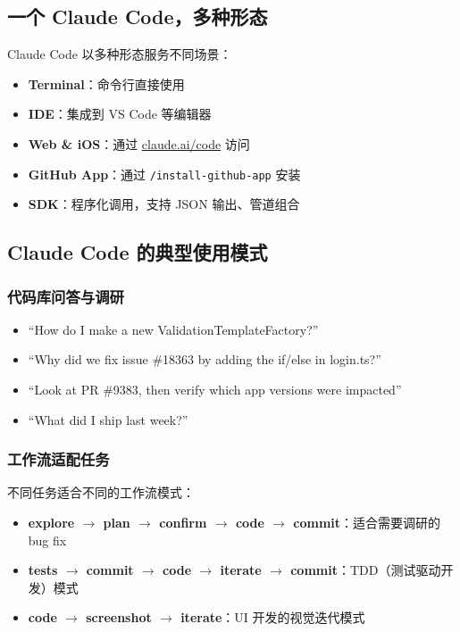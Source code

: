\documentclass[a4paper]{article}
\begin{document}
\subsection{一个 Claude Code，多种形态}

Claude Code 以多种形态服务不同场景：

\begin{itemize}
    \item \textbf{Terminal}：命令行直接使用
    \item \textbf{IDE}：集成到 VS Code 等编辑器
    \item \textbf{Web \& iOS}：通过 \url{claude.ai/code} 访问
    \item \textbf{GitHub App}：通过 \texttt{/install-github-app} 安装
    \item \textbf{SDK}：程序化调用，支持 JSON 输出、管道组合
\end{itemize}

\subsection{Claude Code 的典型使用模式}

\subsubsection{代码库问答与调研}

\begin{itemize}
    \item ``How do I make a new ValidationTemplateFactory?''
    \item ``Why did we fix issue \#18363 by adding the if/else in login.ts?''
    \item ``Look at PR \#9383, then verify which app versions were impacted''
    \item ``What did I ship last week?''
\end{itemize}

\subsubsection{工作流适配任务}

不同任务适合不同的工作流模式：
\begin{itemize}
    \item \textbf{explore $\rightarrow$ plan $\rightarrow$ confirm $\rightarrow$ code $\rightarrow$ commit}：适合需要调研的 bug fix
    \item \textbf{tests $\rightarrow$ commit $\rightarrow$ code $\rightarrow$ iterate $\rightarrow$ commit}：TDD（测试驱动开发）模式
    \item \textbf{code $\rightarrow$ screenshot $\rightarrow$ iterate}：UI 开发的视觉迭代模式
\end{itemize}
\end{document}
